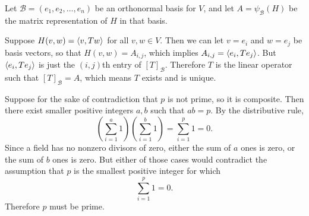 \documentclass{article}
\begin{document}
\bigskip
\par
\begin{prob}
\end{prob}
Let $\mathcal{B} = (e_1, e_2, \dots, e_n)$ be an orthonormal basis for $V$, and let $A = \psi_\mathcal{B}(H)$ be the matrix representation of $H$ in that basis.
\par
Suppose $H(v,w)=\left\langle v, Tw \right\rangle$ for all $v,w \in V$. Then we can let $v=e_i$ and $w=e_j$ be basis vectors, so that $H(v,w)=A_{i,j}$, which implies $A_{i,j} = \left\langle e_i, T e_j \right\rangle$. But $\left\langle e_i, T e_j \right\rangle$ is just the $(i,j)$th entry of $[T]_\mathcal{B}$. Therefore $T$ is the linear operator such that $[T]_\mathcal{B} = A$, which means $T$ exists and is unique.


\bigskip
\par
\begin{prob}
\end{prob}
Suppose for the sake of contradiction that $p$ is not prime, so it is composite. Then there exist smaller positive integers $a, b$ such that $ab=p$. By the distributive rule,
\[ \left( \sum_{i=1}^a 1 \right) \left( \sum_{i=1}^b 1 \right) = \sum_{i=1}^p 1 = 0. \]
Since a field has no nonzero divisors of zero, either the sum of $a$ ones is zero, or the sum of $b$ ones is zero. But either of those cases would contradict the assumption that $p$ is the smallest positive integer for which
\[ \sum_{i=1}^p 1 = 0. \]
Therefore $p$ must be prime.



\end{document}
